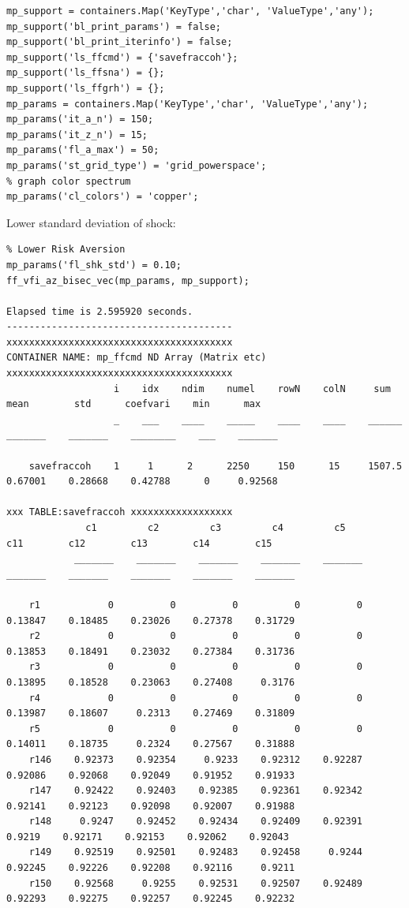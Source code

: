 \documentclass[
]{book}
\begin{document}
\begin{verbatim}
mp_support = containers.Map('KeyType','char', 'ValueType','any');
mp_support('bl_print_params') = false;
mp_support('bl_print_iterinfo') = false;
mp_support('ls_ffcmd') = {'savefraccoh'};
mp_support('ls_ffsna') = {};
mp_support('ls_ffgrh') = {};
mp_params = containers.Map('KeyType','char', 'ValueType','any');
mp_params('it_a_n') = 150;
mp_params('it_z_n') = 15;
mp_params('fl_a_max') = 50;
mp_params('st_grid_type') = 'grid_powerspace';
% graph color spectrum
mp_params('cl_colors') = 'copper';
\end{verbatim}

Lower standard deviation of shock:

\begin{verbatim}
% Lower Risk Aversion
mp_params('fl_shk_std') = 0.10;
ff_vfi_az_bisec_vec(mp_params, mp_support);

Elapsed time is 2.595920 seconds.
----------------------------------------
xxxxxxxxxxxxxxxxxxxxxxxxxxxxxxxxxxxxxxxx
CONTAINER NAME: mp_ffcmd ND Array (Matrix etc)
xxxxxxxxxxxxxxxxxxxxxxxxxxxxxxxxxxxxxxxx
                   i    idx    ndim    numel    rowN    colN     sum       mean        std      coefvari    min      max  
                   _    ___    ____    _____    ____    ____    ______    _______    _______    ________    ___    _______

    savefraccoh    1     1      2      2250     150      15     1507.5    0.67001    0.28668    0.42788      0     0.92568

xxx TABLE:savefraccoh xxxxxxxxxxxxxxxxxx
              c1         c2         c3         c4         c5         c11        c12        c13        c14        c15  
            _______    _______    _______    _______    _______    _______    _______    _______    _______    _______

    r1            0          0          0          0          0    0.13847    0.18485    0.23026    0.27378    0.31729
    r2            0          0          0          0          0    0.13853    0.18491    0.23032    0.27384    0.31736
    r3            0          0          0          0          0    0.13895    0.18528    0.23063    0.27408     0.3176
    r4            0          0          0          0          0    0.13987    0.18607     0.2313    0.27469    0.31809
    r5            0          0          0          0          0    0.14011    0.18735     0.2324    0.27567    0.31888
    r146    0.92373    0.92354     0.9233    0.92312    0.92287    0.92086    0.92068    0.92049    0.91952    0.91933
    r147    0.92422    0.92403    0.92385    0.92361    0.92342    0.92141    0.92123    0.92098    0.92007    0.91988
    r148     0.9247    0.92452    0.92434    0.92409    0.92391     0.9219    0.92171    0.92153    0.92062    0.92043
    r149    0.92519    0.92501    0.92483    0.92458     0.9244    0.92245    0.92226    0.92208    0.92116     0.9211
    r150    0.92568     0.9255    0.92531    0.92507    0.92489    0.92293    0.92275    0.92257    0.92245    0.92232
\end{verbatim}
\end{document}
